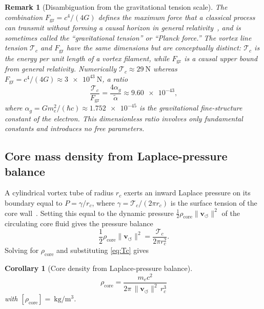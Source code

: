 \documentclass[aps,pra,preprint,longbibliography,nofootinbib]{revtex4-2}
\newtheorem{corollary}{Corollary}
\newtheorem{remark}{Remark}
\newcommand{\vnorm}{\lVert\mathbf{v}_{\!\boldsymbol{\circlearrowleft}}\rVert} %
\newcommand{\rhocore}{\rho_{\mathrm{core}}}      %
\newcommand{\rc}{r_c}                            %
\newcommand{\Tc}{\mathcal{T}_c}                  %
\newcommand{\Fgr}{F_{\mathrm{gr}}}              %
\begin{document}
\begin{remark}[Disambiguation from the gravitational tension scale]
\label{rem:Fgr}
The combination $\Fgr = c^4/(4G)$ defines the maximum force that
a classical process can transmit without forming a causal horizon
in general relativity~\cite{Gibbons2002,Schiller2006}, and is
sometimes called the ``gravitational tension'' or ``Planck force.''
The vortex line tension $\Tc$ and $\Fgr$ have the same dimensions
but are conceptually distinct:
$\Tc$ is the energy per unit length of a vortex filament,
while $\Fgr$ is a causal upper bound from general relativity.
Numerically $\Tc \approx \SI{29}{\newton}$ whereas
$\Fgr = c^4/(4G) \approx \SI{3e43}{\newton}$, a ratio
\begin{equation}
  \frac{\Tc}{\Fgr}
  = \frac{4\alpha_g}{\tilde\alpha}
  \approx \num{9.60e-43},
  \label{eq:tension_ratio}
\end{equation}
where $\alpha_g = Gm_e^2/(\hbar c) \approx \num{1.752e-45}$
is the gravitational fine-structure constant of the electron.
This dimensionless ratio involves only fundamental constants and
introduces no free parameters.
\end{remark}

\subsection{Core mass density from Laplace-pressure balance}
\label{sec:rhocore}

A cylindrical vortex tube of radius $\rc$ exerts an inward
Laplace pressure on its boundary equal to $P = \gamma/\rc$,
where $\gamma = \Tc/(2\pi\rc)$ is the surface tension of the
core wall~\cite{Saffman1992,Donnelly1991}.
Setting this equal to the dynamic pressure
$\frac{1}{2}\rhocore\vnorm^2$ of the circulating core fluid
gives the pressure balance
\begin{equation}
  \frac{1}{2}\rhocore\vnorm^2 = \frac{\Tc}{2\pi\rc^2}.
  \label{eq:pressure_balance}
\end{equation}
Solving for $\rhocore$ and substituting \eqref{eq:Tc} gives

\begin{corollary}[Core density from Laplace-pressure balance]
\label{cor:rho}
\begin{equation}
  \boxed{
    \rhocore = \frac{m_e c^2}{2\pi\,\vnorm^2\,\rc^3}
  }
  \label{eq:rhocore_boxed}
\end{equation}
with $[\rhocore] = \SI{}{\kilogram\per\cubic\meter}$.
\end{corollary}
\end{document}
